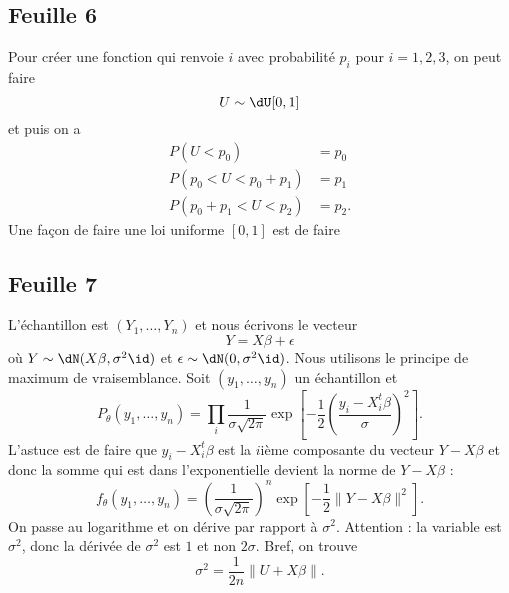 \subsection{Feuille 6}

Pour créer une fonction qui renvoie \( i\) avec probabilité \( p_i\) pour \( i=1,2,3\), on peut faire
\begin{equation}
	U\sim\dU[0,1]
\end{equation}
et puis on a
\begin{subequations}
	\begin{align}
		P(U<p_0)         & =p_0  \\
		P(p_0<U<p_0+p_1) & =p_1  \\
		P(p_0+p_1<U<p_2) & =p_2.
	\end{align}
\end{subequations}
Une façon de faire une loi uniforme \( [0,1]\) est de faire 

\subsection{Feuille 7}

L'échantillon est \( (Y_1,\ldots, Y_n) \) et nous écrivons le vecteur
\begin{equation}
	Y=X\beta+\epsilon
\end{equation}
où \( Y\sim\dN(X\beta,\sigma^2\id)\) et \( \epsilon\sim\dN(0,\sigma^2\id)\). Nous utilisons le principe de maximum de vraisemblance. Soit \( (y_1,\ldots, y_n)\) un échantillon et
\begin{equation}
	P_{\theta}(y_1,\ldots, y_n)=\prod_i\frac{1}{ \sigma\sqrt{2\pi }}\exp\left[ -\frac{ 1 }{2}\left( \frac{ y_i-X_i^t\beta }{ \sigma } \right)^2 \right].
\end{equation}
L'astuce est de faire que \( y_i-X_i^t\beta\) est la \( i\)ième composante du vecteur \( Y-X\beta\) et donc la somme qui est dans l'exponentielle devient la norme de \( Y-X\beta\) :
\begin{equation}
	f_{\theta}(y_1,\ldots, y_n)=\left( \frac{1}{ \sigma\sqrt{2\pi} } \right)^n\exp\left[ -\frac{ 1 }{2}\| Y-X\beta \|^2 \right].
\end{equation}
On passe au logarithme et on dérive par rapport à \( \sigma^2\). Attention : la variable est \( \sigma^2\), donc la dérivée de \( \sigma^2\) est \( 1\) et non \( 2\sigma\). Bref, on trouve
\begin{equation}
	\sigma^2=\frac{1}{ 2n }\| U+X\beta \|.
\end{equation}

